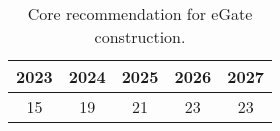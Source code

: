 \begin{table}[ht]
\centering
\begin{tabular}{ccccc}
  \hline
{\textbf{2023}} & {\textbf{2024}} & {\textbf{2025}} & {\textbf{2026}} & {\textbf{2027}} \\ 
  \hline
 15 &  19 &  21 &  23 &  23 \\ 
   \hline
\end{tabular}
\caption{Core recommendation for eGate construction. \label{tab:core_recommendation}} 
\end{table}
